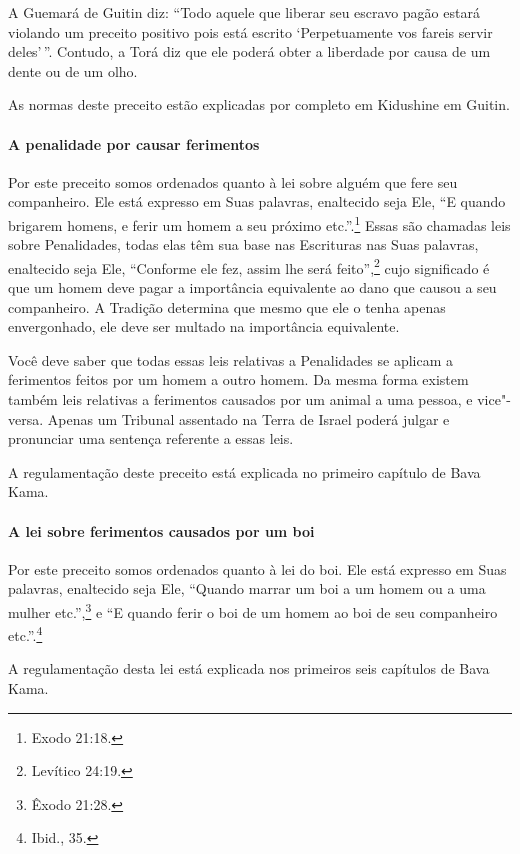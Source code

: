 \begin{multicols}{2}
A Guemará\starr{} de Guitin\starr{} diz: ``Todo aquele que liberar seu escravo pagão
estará violando um preceito positivo pois está escrito `Perpetuamente
vos fareis servir deles'\,''. Contudo, a Torá\starr{} diz que ele poderá obter a
liberdade por causa de um dente ou de um olho.

As normas deste preceito estão explicadas por completo em Kidushin\starr e em
Guitin\starr.

\paragraph{A penalidade por causar ferimentos}

Por este preceito somos ordenados quanto à lei sobre alguém que fere seu
companheiro. Ele está expresso em Suas palavras, enaltecido seja Ele,
``E quando brigarem homens, e ferir um homem a seu próximo etc.''.\footnote{Exodo
21:18.} Essas são chamadas leis sobre Penalidades, todas elas têm sua
base nas Escrituras nas Suas palavras, enaltecido seja Ele, ``Conforme
ele fez, assim lhe será feito'',\footnote{Levítico 24:19.} cujo significado é que
um homem deve pagar a importância equivalente ao dano que causou a seu
companheiro. A Tradição determina que mesmo que ele o tenha apenas
envergonhado, ele deve ser multado na importância equivalente.

Você deve saber que todas essas leis relativas a Penalidades se aplicam
a ferimentos feitos por um homem a outro homem. Da mesma forma existem também leis relativas a ferimentos causados por um animal a uma
pessoa, e vice"-versa. Apenas um Tribunal assentado na Terra de Israel
poderá julgar e pronunciar uma sentença referente a essas leis.

A regulamentação deste preceito está explicada no primeiro capítulo de
Bava Kama\starr.

\paragraph{A lei sobre ferimentos causados por um boi}

Por este preceito somos ordenados quanto à lei do boi. Ele está
expresso em Suas palavras, enaltecido seja Ele, ``Quando marrar um boi
a um homem ou a uma mulher etc.'',\footnote{Êxodo 21:28.} e ``E quando ferir o
boi de um homem ao boi de seu companheiro etc.''.\footnote{Ibid., 35.}

A regulamentação desta lei está explicada nos primeiros seis capítulos
de Bava Kama\starr.


\end{multicols}
